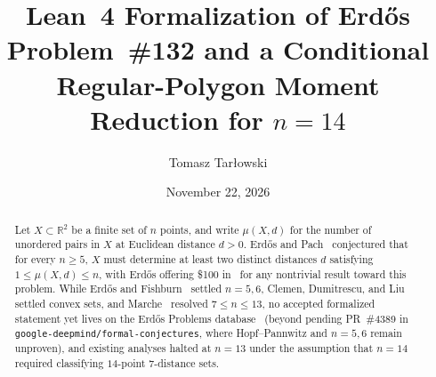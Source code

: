 \documentclass[11pt,reqno]{amsart}
\title[Erd\H{o}s Problem \#132: Formalization and Moment Obstructions]{Lean~4 Formalization of Erd\H{o}s Problem~\#132 and a Conditional Regular-Polygon Moment Reduction for $n=14$}
\author{Tomasz Tar\l{}owski}
\date{November 22, 2026}
\theoremstyle{definition}
\newcommand{\R}{\mathbb{R}}
\begin{document}
\begin{abstract}
Let $X \subset \R^2$ be a finite set of $n$ points, and write $\mu(X, d)$ for the number of unordered pairs in $X$ at Euclidean distance $d > 0$. Erd\H{o}s and Pach~\cite{Er84c,ErPa90,ErFi95,Er97e} conjectured that for every $n \ge 5$, $X$ must determine at least two distinct distances $d$ satisfying $1 \le \mu(X, d) \le n$, with Erd\H{o}s offering \$100 in~\cite{Er97e} for any nontrivial result toward this problem. While Erd\H{o}s and Fishburn~\cite{ErFi95} settled $n = 5, 6$, Clemen, Dumitrescu, and Liu~\cite{CDL25} settled convex sets, and Marche~\cite{Ma26} resolved $7 \le n \le 13$, no accepted formalized statement yet lives on the Erd\H{o}s Problems database~\cite{Bl26} (beyond pending PR~\#4389 in \texttt{google-deepmind/\allowbreak formal-conjectures}, where Hopf--Pannwitz and $n = 5, 6$ remain unproven), and existing analyses halted at $n = 13$ under the assumption that $n = 14$ required classifying $14$-point $7$-distance sets.


\end{abstract}
\end{document}
